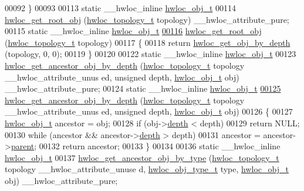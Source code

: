 \begin{DoxyCode}
00092 \}
00093 
00113 \textcolor{keyword}{static} \_\_hwloc\_inline \hyperlink{a00016}{hwloc_obj_t}
00114 \hyperlink{a00053_gadbf58f6e187efbdb3cd9a8e30311b7d7}{hwloc_get_root_obj} (\hyperlink{a00039_ga9d1e76ee15a7dee158b786c30b6a6e38}{hwloc_topology_t} topology) \_\_hwloc\_attribute\_pure;
00115 \textcolor{keyword}{static} \_\_hwloc\_inline \hyperlink{a00016}{hwloc_obj_t}
\hypertarget{a00031_source_l00116}{}\hyperlink{a00053_gadbf58f6e187efbdb3cd9a8e30311b7d7}{00116} \hyperlink{a00053_gadbf58f6e187efbdb3cd9a8e30311b7d7}{hwloc_get_root_obj} (\hyperlink{a00039_ga9d1e76ee15a7dee158b786c30b6a6e38}{hwloc_topology_t} topology)
00117 \{
00118   \textcolor{keywordflow}{return} \hyperlink{a00047_gaedd78240b0c1108355586a268ec5a697}{hwloc_get_obj_by_depth} (topology, 0, 0);
00119 \}
00120 
00122 \textcolor{keyword}{static} \_\_hwloc\_inline \hyperlink{a00016}{hwloc_obj_t}
00123 \hyperlink{a00053_ga9b9d6af74eb0b78b1384aa66dd058ddc}{hwloc_get_ancestor_obj_by_depth} (\hyperlink{a00039_ga9d1e76ee15a7dee158b786c30b6a6e38}{hwloc_topology_t} topology \_\_hwloc\_attribute\_unus
      ed, \textcolor{keywordtype}{unsigned} depth, \hyperlink{a00016}{hwloc_obj_t} obj) \_\_hwloc\_attribute\_pure;
00124 \textcolor{keyword}{static} \_\_hwloc\_inline \hyperlink{a00016}{hwloc_obj_t}
\hypertarget{a00031_source_l00125}{}\hyperlink{a00053_ga9b9d6af74eb0b78b1384aa66dd058ddc}{00125} \hyperlink{a00053_ga9b9d6af74eb0b78b1384aa66dd058ddc}{hwloc_get_ancestor_obj_by_depth} (\hyperlink{a00039_ga9d1e76ee15a7dee158b786c30b6a6e38}{hwloc_topology_t} topology \_\_hwloc\_attribute\_unus
      ed, \textcolor{keywordtype}{unsigned} depth, \hyperlink{a00016}{hwloc_obj_t} obj)
00126 \{
00127   \hyperlink{a00016}{hwloc_obj_t} ancestor = obj;
00128   \textcolor{keywordflow}{if} (obj->\hyperlink{a00016_a9d82690370275d42d652eccdea5d3ee5}{depth} < depth)
00129     \textcolor{keywordflow}{return} NULL;
00130   \textcolor{keywordflow}{while} (ancestor && ancestor->\hyperlink{a00016_a9d82690370275d42d652eccdea5d3ee5}{depth} > depth)
00131     ancestor = ancestor->\hyperlink{a00016_adc494f6aed939992be1c55cca5822900}{parent};
00132   \textcolor{keywordflow}{return} ancestor;
00133 \}
00134 
00136 \textcolor{keyword}{static} \_\_hwloc\_inline \hyperlink{a00016}{hwloc_obj_t}
00137 \hyperlink{a00053_gac93e1a95a71add57ac841daef1b94e5e}{hwloc_get_ancestor_obj_by_type} (\hyperlink{a00039_ga9d1e76ee15a7dee158b786c30b6a6e38}{hwloc_topology_t} topology \_\_hwloc\_attribute\_unuse
      d, \hyperlink{a00041_gacd37bb612667dc437d66bfb175a8dc55}{hwloc_obj_type_t} type, \hyperlink{a00016}{hwloc_obj_t} obj) \_\_hwloc\_attribute\_pure;

\end{DoxyCode}
